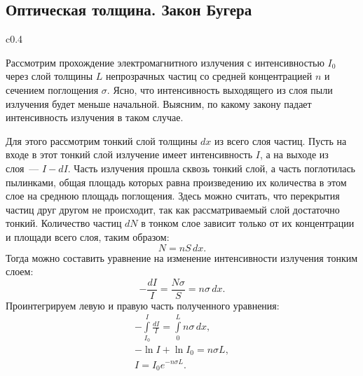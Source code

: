 \subsection{Оптическая толщина. Закон Бугера}
\begin{wrapfigure}[10]{c}{0.4\tw}
	\centering
	\caption{}
	\label{}
\end{wrapfigure}
Рассмотрим прохождение электромагнитного излучения с интенсивностью $I_0$ через слой толщины $L$ непрозрачных частиц со средней концентрацией $n$ и сечением поглощения $\sigma$. Ясно, что интенсивность выходящего из слоя пыли излучения будет меньше начальной. Выясним, по какому закону падает интенсивность излучения в таком случае.

Для этого рассмотрим тонкий слой толщины $dx$ из всего слоя частиц. Пусть на входе в этот тонкий слой излучение имеет интенсивность $I$, а на выходе из слоя~--- $I - dI$. Часть излучения прошла сквозь тонкий слой, а часть поглотилась пылинками, общая площадь которых равна произведению их количества в этом слое на среднюю площадь поглощения. Здесь можно считать, что перекрытия частиц друг другом не происходит, так как рассматриваемый слой достаточно тонкий. Количество частиц  $dN$ в тонком слое зависит только от их концентрации и площади всего слоя, таким образом:
\begin{equation*}
	N = n S \, dx.
\end{equation*}
Тогда можно составить уравнение на изменение интенсивности излучения тонким слоем:
\begin{equation*}
	-\frac{dI}{I} = \frac{N\sigma}{S} = n\sigma \, dx.
\end{equation*}
Проинтегрируем левую и правую часть полученного уравнения:
\begin{gather*}
	-\int\limits_{I_0}^{I} \frac{dI}{I} = \int\limits_{0}^{L} n \sigma \, dx,\\
	-\ln I + \ln I_0 = n\sigma L,\\[.5pc]
	I = I_0 e^{-n\sigma L}. \tag{\theequation}
\end{gather*}

